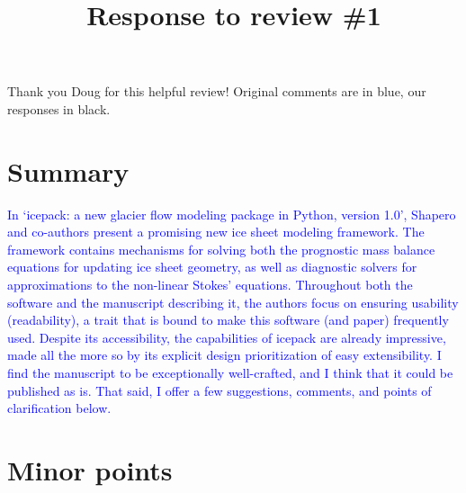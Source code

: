 \documentclass{article}
\theoremstyle{definition}
\theoremstyle{plain}
\begin{document}
\title{Response to review \#1}
\author{}
\date{}

\maketitle

Thank you Doug for this helpful review!
Original comments are in blue, our responses in black.

\section*{Summary}

\textcolor{blue}{In ‘icepack: a new glacier flow modeling package in Python, version 1.0’, Shapero and co-authors present a promising new ice sheet modeling framework. The
framework contains mechanisms for solving both the prognostic mass balance
equations for updating ice sheet geometry, as well as diagnostic solvers for approximations to the non-linear Stokes’ equations. Throughout both the software
and the manuscript describing it, the authors focus on ensuring usability (readability), a trait that is bound to make this software (and paper) frequently used.
Despite its accessibility, the capabilities of icepack are already impressive, made
all the more so by its explicit design prioritization of easy extensibility.
I find the manuscript to be exceptionally well-crafted, and I think that it
could be published as is. That said, I offer a few suggestions, comments, and
points of clarification below.}


\section*{Minor points}
\end{document}
